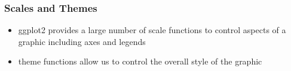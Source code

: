 \documentclass[MASTER.tex]{subfiles}
\begin{document}
\begin{frame}
	\frametitle{Scales and Themes}
	\Large
	\begin{itemize}
		\item ggplot2 provides a large number of scale functions
		to control aspects of a graphic including axes and
		legends
		\item theme functions allow us to control the overall style
		of the graphic
	\end{itemize}
	
	
\end{frame}
\end{document}
